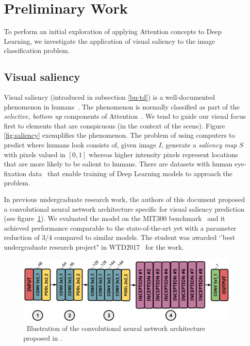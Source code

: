 \documentclass[12pt]{article}
\begin{document}
\section{Preliminary Work}
To perform an initial exploration of applying Attention concepts to Deep Learning,
we investigate the application of visual saliency to the image classification problem.

\subsection{Visual saliency}
Visual saliency (introduced in subsection \ref{bu-td}) is a well-documented phenomenon in
humans~\cite{ref:guided-search}\cite{ref:fit}.
The phenomenon is normally classified as part of the \emph{selective, bottom up} components of
Attention~\cite{ref:vocus}.
We tend to guide our visual focus first to elements that are conspicuous (in the context of the scene).
Figure \ref{fig:saliency} exemplifies the phenomenon.
The problem of using computers to predict where humans look
consists of, given image $I$, generate a \emph{saliency map} $S$ with pixels valued in $[0, 1]$ whereas
higher intensity pixels represent locations that are more likely to be salient to humans.
There are datasets with human eye-fixation data~\cite{ref:salicon-dataset}
that enable training of Deep Learning models to approach the problem.

In previous undergraduate research work, the authors of this document proposed a convolutional neural
network architecture specific for visual saliency prediction~\cite{ref:erik-esther}
(see figure~\ref{fig:deeppeek}).
We evaluated the model on the MIT300 benchmark~\cite{ref:mit-bm} and it achieved performance comparable
to the state-of-the-art yet with a parameter reduction of $3/4$ compared to similar models.
The student was awarded `'best undergraduate research project" in WTD2017~\cite{ref:wtd2017} for the work.

\begin{figure}
\begin{center}
	\includegraphics[width=0.7\linewidth]{./img/deeppeek.png}
\caption{\
    Illustration of the convolutional neural network architecture proposed in \cite{ref:erik-esther}.
}
\label{fig:deeppeek}
\end{center}
\end{figure}
\end{document}
